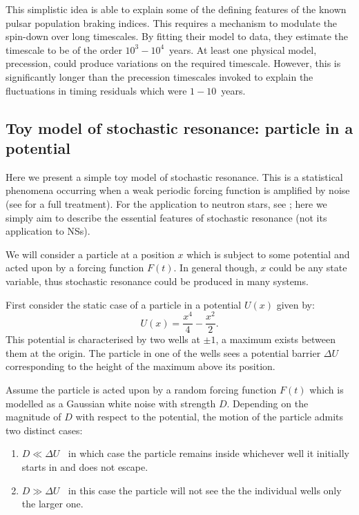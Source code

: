 This simplistic idea is able to explain some of the defining features of the
known pulsar population braking indices. This requires a mechanism to modulate
the spin-down over long timescales. By fitting their model to data, they
estimate the timescale to be of the order $10^{3}-10^{4}$~years. At least one
physical model, precession, could produce variations on the required timescale.
However, this is significantly longer than the precession timescales invoked to
explain the fluctuations in timing residuals which were $1-10$~years.
\begin{subappendices}
\subsection{Toy model of stochastic resonance: particle in a potential}
\label{App: Stochastic}

Here we present a simple toy model of stochastic resonance. This is a
statistical phenomena occurring when a weak periodic forcing function is
amplified by noise (see \citet{Jung1991} for a full treatment).  For the
application to neutron stars, see \citet{Cordes2013}; here we simply aim to
describe the essential features of stochastic resonance (not its application to
NSs).

We will consider a particle at a position $x$ which is subject to some
potential and acted upon by a forcing function $F(t)$. In general though, $x$
could be any state variable, thus stochastic resonance could be produced
in many systems.

First consider the static case of a particle in a potential $U(x)$  given by:
\begin{equation}
    U(x) = \frac{x^{4}}{4}-\frac{x^{2}}{2}.
\end{equation}
This potential is characterised by two wells at $\pm1$, a maximum exists
between them at the origin. The particle in one of the wells sees a potential
barrier $\Delta U$ corresponding to the height of the maximum above its
position.

Assume the particle is acted upon by a random forcing function $F(t)$ which is
modelled as a Gaussian white noise with strength $D$. Depending on the
magnitude of $D$ with respect to the potential, the motion of the particle
admits two distinct cases:
\begin{enumerate}
\item $D \ll \Delta U \;\;$ in which case the particle remains inside whichever
    well it initially starts in and does not escape.
\item $D \gg \Delta U \;\;$ in this case the particle will not see the the
    individual wells only the larger one.
\end{enumerate}


\end{subappendices}
